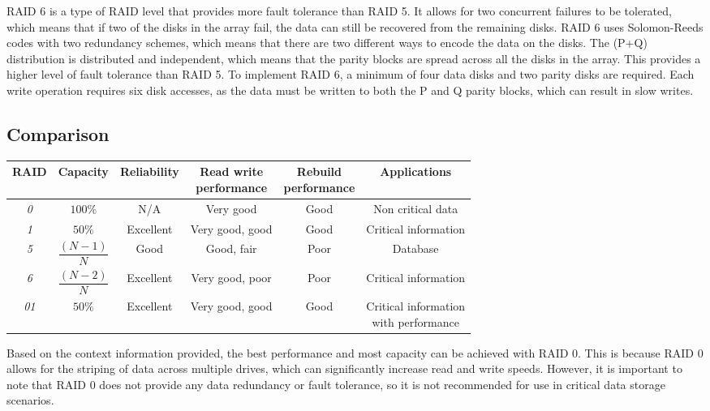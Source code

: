 RAID 6 is a type of RAID level that provides more fault tolerance than RAID 5. 
It allows for two concurrent failures to be tolerated, which means that if two of the disks in the array fail, the data can still be recovered from the remaining disks. 
RAID 6 uses Solomon-Reeds codes with two redundancy schemes, which means that there are two different ways to encode the data on the disks. 
The (P+Q) distribution is distributed and independent, which means that the parity blocks are spread across all the disks in the array. 
This provides a higher level of fault tolerance than RAID 5. To implement RAID 6, a minimum of four data disks and two parity disks are required. 
Each write operation requires six disk accesses, as the data must be written to both the P and Q parity blocks, which can result in slow writes.



\subsection{Comparison}
\begin{table}[H]
    \centering
    \begin{tabular}{|c|ccccc|}
    \hline
    \textbf{RAID} & \textbf{Capacity} & \textbf{Reliability} & \makecell{\textbf{Read write} \\\textbf{performance}} & \makecell{\textbf{Rebuild} \\\textbf{performance}} & \textbf{Applications}                 \\ \hline
    \textit{0}    & $100\%$           & N/A                  & Very good                       & Good                         & Non critical data                     \\
    \textit{1}    & $50\%$            & Excellent            & Very good, good                 & Good                         & Critical information                  \\
    \textit{5}    & $\dfrac{\left(N-1\right)}{N}$   & Good                 & Good, fair                      & Poor                         & Database                              \\
    \textit{6}    & $\dfrac{\left(N-2\right)}{N}$   & Excellent            & Very good, poor                 & Poor                         & Critical information                  \\
    \textit{01}   & $50\%$            & Excellent            & Very good, good                 & Good                         & \makecell{Critical information \\ with performance} \\ \hline
    \end{tabular}
\end{table}
Based on the context information provided, the best performance and most capacity can be achieved with RAID 0. 
This is because RAID 0 allows for the striping of data across multiple drives, which can significantly increase read and write speeds. 
However, it is important to note that RAID 0 does not provide any data redundancy or fault tolerance, so it is not recommended for use in critical data storage scenarios.

